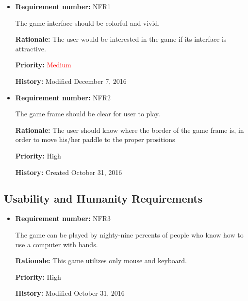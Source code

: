 \documentclass[12pt,letterpaper]{article}
\begin{document}
\begin{reqbox}
	\begin{itemize}
	\item \textbf{Requirement number: }NFR1

		The game interface should be colorful and vivid.

		\textbf{Rationale: } The user would be interested in the game if its interface is attractive.

		\textbf{Priority: } \textcolor{red}{Medium}

		\textbf{History: } Modified December 7, 2016
	
		\item \textbf{Requirement number: }NFR2

		The game frame should be clear for user to play.

		\textbf{Rationale: } The user should know where the border of the game frame is, in order to move his/her paddle to the proper prositions

		\textbf{Priority:  }High

		\textbf{History: } Created October 31, 2016

	\end{itemize}
\end{reqbox}


\subsection{Usability and Humanity Requirements}

\begin{reqbox}
	\begin{itemize}
	\subsubsection{Ease of Use Requirements}	

	\item \textbf{Requirement number: }NFR3
	   	
		The game can be played by nighty-nine percents of people who know  how to use a computer with hands.

		\textbf{Rationale: } This game utilizes only mouse and keyboard.

		\textbf{Priority: }High

		\textbf{History: }Modified October 31, 2016

	\end{itemize}
\end{reqbox}
\end{document}
